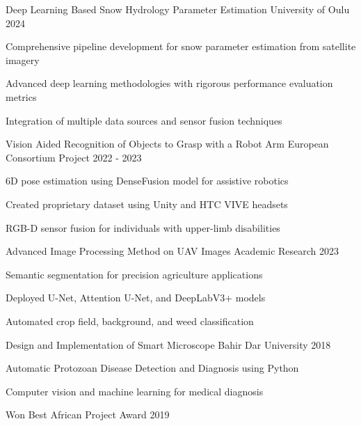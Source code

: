 \documentclass[13pt, a4paper]{awesome-cv}
\begin{document}
\begin{cventries}
  \cventry
    {Deep Learning Based Snow Hydrology Parameter Estimation} %
    {University of Oulu} %
    {} %
    {2024} %
    {
      \begin{cvitems}
        \item {Comprehensive pipeline development for snow parameter estimation from satellite imagery}
        \item {Advanced deep learning methodologies with rigorous performance evaluation metrics}
        \item {Integration of multiple data sources and sensor fusion techniques}
      \end{cvitems}
    }

  \cventry
    {Vision Aided Recognition of Objects to Grasp with a Robot Arm} %
    {European Consortium Project} %
    {} %
    {2022 - 2023} %
    {
      \begin{cvitems}
        \item {6D pose estimation using DenseFusion model for assistive robotics}
        \item {Created proprietary dataset using Unity and HTC VIVE headsets}
        \item {RGB-D sensor fusion for individuals with upper-limb disabilities}
      \end{cvitems}
    }

  \cventry
    {Advanced Image Processing Method on UAV Images} %
    {Academic Research} %
    {} %
    {2023} %
    {
      \begin{cvitems}
        \item {Semantic segmentation for precision agriculture applications}
        \item {Deployed U-Net, Attention U-Net, and DeepLabV3+ models}
        \item {Automated crop field, background, and weed classification}
      \end{cvitems}
    }

  \cventry
    {Design and Implementation of Smart Microscope} %
    {Bahir Dar University} %
    {} %
    {2018} %
    {
      \begin{cvitems}
        \item {Automatic Protozoan Disease Detection and Diagnosis using Python}
        \item {Computer vision and machine learning for medical diagnosis}
        \item {Won Best African Project Award 2019}
      \end{cvitems}
    }
\end{cventries}
\end{document}
